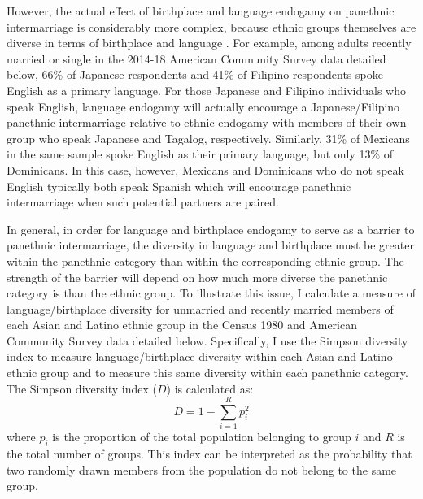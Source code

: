 \documentclass[11pt,]{article}
\begin{document}
However, the actual effect of birthplace and language endogamy on panethnic intermarriage is considerably more complex, because ethnic groups themselves are diverse in terms of birthplace and language \citep{jimenez_how_2015}. For example, among adults recently married or single in the 2014-18 American Community Survey data detailed below, 66\% of Japanese respondents and 41\% of Filipino respondents spoke English as a primary language. For those Japanese and Filipino individuals who speak English, language endogamy will actually encourage a Japanese/Filipino panethnic intermarriage relative to ethnic endogamy with members of their own group who speak Japanese and Tagalog, respectively. Similarly, 31\% of Mexicans in the same sample spoke English as their primary language, but only 13\% of Dominicans. In this case, however, Mexicans and Dominicans who do not speak English typically both speak Spanish which will encourage panethnic intermarriage when such potential partners are paired.

In general, in order for language and birthplace endogamy to serve as a barrier to panethnic intermarriage, the diversity in language and birthplace must be greater within the panethnic category than within the corresponding ethnic group. The strength of the barrier will depend on how much more diverse the panethnic category is than the ethnic group. To illustrate this issue, I calculate a measure of language/birthplace diversity for unmarried and recently married members of each Asian and Latino ethnic group in the Census 1980 and American Community Survey data detailed below. Specifically, I use the Simpson diversity index to measure language/birthplace diversity within each Asian and Latino ethnic group and to measure this same diversity within each panethnic category. The Simpson diversity index (\(D\)) is calculated as: \[D=1-\sum_{i=1}^R p_i^2\] where \(p_i\) is the proportion of the total population belonging to group \(i\) and \(R\) is the total number of groups. This index can be interpreted as the probability that two randomly drawn members from the population do not belong to the same group.
\end{document}
